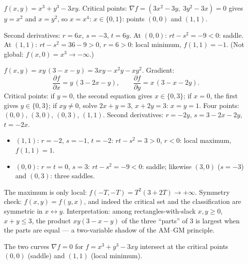 \begin{example}\label{ex:b1:multivar:extrema}
$f(x,y) = x^3 + y^3 - 3xy$. Critical points: $\nabla f = (3x^2 -
3y,\; 3y^2 - 3x) = 0$ gives $y = x^2$ and $x = y^2$, so $x = x^4$:
$x \in \{0, 1\}$: points $(0,0)$ and $(1,1)$.

Second derivatives: $r = 6x$, $s = -3$, $t = 6y$. At $(0,0)$: $rt -
s^2 = -9 < 0$: saddle. At $(1,1)$: $rt - s^2 = 36 - 9 > 0$, $r = 6
> 0$: local minimum, $f(1,1) = -1$. (Not global: $f(x, 0) = x^3 \to
-\infty$.)
\end{example}

\begin{example}
\label{ex:b1:multivar:fourpoints}
$f(x, y) = xy\,(3 - x - y) = 3xy - x^2y - xy^2$. Gradient:
\[
\frac{\partial f}{\partial x} = y\,(3 - 2x - y),
\qquad
\frac{\partial f}{\partial y} = x\,(3 - x - 2y).
\]
Critical points: if $y = 0$, the second equation gives $x \in
\{0, 3\}$; if $x = 0$, the first gives $y \in \{0, 3\}$; if $xy
\neq 0$, solve $2x + y = 3$, $x + 2y = 3$: $x = y = 1$. Four
points: $(0,0)$, $(3,0)$, $(0,3)$, $(1,1)$. Second derivatives:
$r = -2y$, $s = 3 - 2x - 2y$, $t = -2x$.
\begin{itemize}
  \item $(1,1)$: $r = -2$, $s = -1$, $t = -2$: $rt - s^2 = 3 >
        0$, $r < 0$: local maximum, $f(1,1) = 1$.
  \item $(0,0)$: $r = t = 0$, $s = 3$: $rt - s^2 = -9 < 0$:
        saddle; likewise $(3, 0)$ ($s = -3$) and $(0, 3)$: three
        saddles.
\end{itemize}
The maximum is only local: $f(-T, -T) = T^2(3 + 2T) \to
+\infty$. Symmetry check: $f(x, y) = f(y, x)$, and indeed the
critical set and the classification are symmetric in $x
\leftrightarrow y$. Interpretation: among rectangles-with-slack
$x, y \geq 0$, $x + y \leq 3$, the product $xy(3 - x - y)$ of
the three ``parts'' of $3$ is largest when the parts are equal
--- a two-variable shadow of the AM--GM principle.
\end{example}

\begin{omfigure}

{\small The two curves $\nabla f = 0$ for $f = x^3 + y^3 - 3xy$
intersect at the critical points $(0,0)$ (saddle) and $(1,1)$
(local minimum).}
\end{omfigure}

